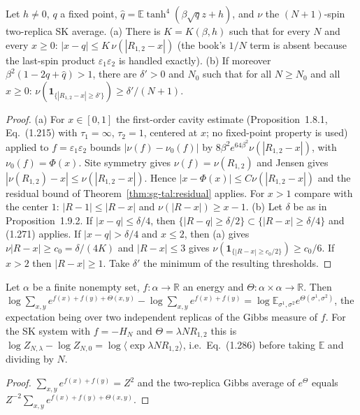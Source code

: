 \begin{theorem}
\label{thm:sg-tal:prop-195}
  \leanok
{}
Let $h\ne0$, $q$ a fixed point, $\hat q=\mathbb E\tanh^4(\beta\sqrt qz+h)$, and $\nu$ the $(N+1)$-spin two-replica SK average.
(a) There is $K=K(\beta,h)$ such that for every $N$ and every $x\ge0$: $|x-q|\le K\,\nu(|R_{1,2}-x|)$ (the book's $1/N$ term is absent because
the last-spin product $\varepsilon_1\varepsilon_2$ is handled exactly).
(b) If moreover $\beta^2(1-2q+\hat q)>1$, there are $\delta'>0$ and $N_0$ such that for all $N\ge N_0$ and all $x\ge0$:
$\nu(\mathbf 1_{\{|R_{1,2}-x|\ge\delta'\}})\ge\delta'/(N+1)$.
\end{theorem}
\begin{proof}
  \leanok
(a) For $x\in[0,1]$ the first-order cavity estimate (Proposition~1.8.1, Eq.~(1.215) with $\tau_1=\infty$, $\tau_2=1$, centered at $x$; no fixed-point property is
used) applied to $f=\varepsilon_1\varepsilon_2$ bounds $|\nu(f)-\nu_0(f)|$ by $8\beta^2e^{64\beta^2}\nu(|R_{1,2}-x|)$, with $\nu_0(f)=\Phi(x)$.  Site symmetry gives
$\nu(f)=\nu(R_{1,2})$ and Jensen gives $|\nu(R_{1,2})-x|\le\nu(|R_{1,2}-x|)$.  Hence $|x-\Phi(x)|\le C\nu(|R_{1,2}-x|)$ and the residual bound of
Theorem~\ref{thm:sg-tal:residual} applies.  For $x>1$ compare with the center $1$: $|R-1|\le|R-x|$ and $\nu(|R-x|)\ge x-1$.
(b) Let $\delta$ be as in Proposition~1.9.2.  If $|x-q|\le\delta/4$, then $\{|R-q|\ge\delta/2\}\subset\{|R-x|\ge\delta/4\}$ and (1.271) applies.  If $|x-q|>\delta/4$ and $x\le2$, then
(a) gives $\nu|R-x|\ge c_0=\delta/(4K)$ and $|R-x|\le3$ gives $\nu(\mathbf 1_{\{|R-x|\ge c_0/2\}})\ge c_0/6$.  If $x>2$ then $|R-x|\ge1$.  Take $\delta'$ the minimum of the
resulting thresholds.
\end{proof}

\begin{theorem}
\label{thm:sg-tal:coupled-log}
  \leanok
{}
Let $\alpha$ be a finite nonempty set, $f:\alpha\to\mathbb R$ an energy and $\Theta:\alpha\times\alpha\to\mathbb R$.  Then
$\log\sum_{x,y}e^{f(x)+f(y)+\Theta(x,y)}-\log\sum_{x,y}e^{f(x)+f(y)}=\log\mathbb E_{\sigma^1,\sigma^2}e^{\Theta(\sigma^1,\sigma^2)}$,
the expectation being over two independent replicas of the Gibbs measure of $f$.  For the SK system with $f=-H_N$ and
$\Theta=\lambda N R_{1,2}$ this is $\log Z_{N,\lambda}-\log Z_{N,0}=\log\langle\exp\lambda NR_{1,2}\rangle$, i.e.\ Eq.~(1.286) before taking $\mathbb E$ and dividing by $N$.
\end{theorem}
\begin{proof}
  \leanok
$\sum_{x,y}e^{f(x)+f(y)}=Z^2$ and the two-replica Gibbs average of $e^{\Theta}$ equals $Z^{-2}\sum_{x,y}e^{f(x)+f(y)+\Theta(x,y)}$.
\end{proof}

